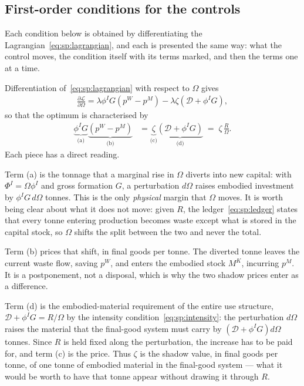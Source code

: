 \subsection{First-order conditions for the controls}\label{sec:app:sp:foc}

Each condition below is obtained by differentiating the Lagrangian~\eqref{eq:sp:lagrangian}, and each is presented the same way: what the control moves, the condition itself with its terms marked, and then the terms one at a time.

Differentiation of~\eqref{eq:sp:lagrangian} with respect to $\Omega$ gives
\begin{align*}
    \frac{\partial \mathcal{L}}{\partial \Omega} = \lambda \phi^IG\left(p^W-p^M\right) - \lambda \zeta \left(\mathcal{D}+\phi^IG\right),
\end{align*}
so that the optimum is characterised by
\begin{align}
    \underbrace{\phi^IG}_{\text{(a)}}\underbrace{\left(p^W-p^M\right)}_{\text{(b)}}
    &= \underbrace{\zeta}_{\text{(c)}}\underbrace{\left(\mathcal D+\phi^IG\right)}_{\text{(d)}}
    \;=\;\zeta\,\frac{R}{\Omega}.
\label{eq:sp:foc:Omega}
\end{align}
Each piece has a direct reading.

Term (a) is the tonnage that a marginal rise in $\Omega$ diverts into new capital: with $\Phi^I=\Omega\phi^I$ and gross formation $G$, a perturbation $d\Omega$ raises embodied investment by $\phi^IG\,d\Omega$ tonnes. This is the only \emph{physical} margin that $\Omega$ moves. It is worth being clear about what it does not move: given $R$, the ledger~\eqref{eq:sp:ledger} states that every tonne entering production becomes waste except what is stored in the capital stock, so $\Omega$ shifts the split between the two and never the total.

Term (b) prices that shift, in final goods per tonne. The diverted tonne leaves the current waste flow, saving $p^W$, and enters the embodied stock $M^K$, incurring $p^M$. It is a postponement, not a disposal, which is why the two shadow prices enter as a difference.

Term (d) is the embodied-material requirement of the entire use structure, $\mathcal D+\phi^IG=R/\Omega$ by the intensity condition~\eqref{eq:sp:intensity}: the perturbation $d\Omega$ raises the material that the final-good system must carry by $\left(\mathcal D+\phi^IG\right)d\Omega$ tonnes. Since $R$ is held fixed along the perturbation, the increase has to be paid for, and term (c) is the price. Thus $\zeta$ is the shadow value, in final goods per tonne, of one tonne of embodied material in the final-good system --- what it would be worth to have that tonne appear without drawing it through $R$.

